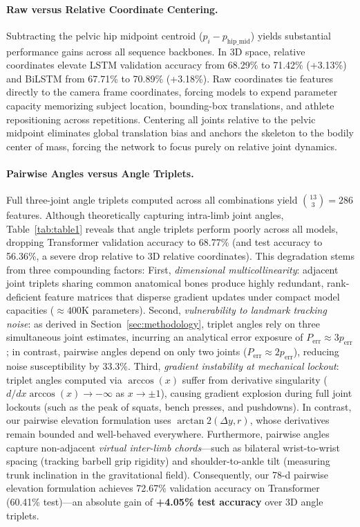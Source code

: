 \documentclass[runningheads]{llncs}
\begin{document}
\paragraph{Raw versus Relative Coordinate Centering.} Subtracting the pelvic hip midpoint centroid ($p_i - p_{\text{hip\_mid}}$) yields substantial performance gains across all sequence backbones. In 3D space, relative coordinates elevate LSTM validation accuracy from 68.29\% to 71.42\% (+3.13\%) and BiLSTM from 67.71\% to 70.89\% (+3.18\%). Raw coordinates tie features directly to the camera frame coordinates, forcing models to expend parameter capacity memorizing subject location, bounding-box translations, and athlete repositioning across repetitions. Centering all joints relative to the pelvic midpoint eliminates global translation bias and anchors the skeleton to the bodily center of mass, forcing the network to focus purely on relative joint dynamics.

\paragraph{Pairwise Angles versus Angle Triplets.} Full three-joint angle triplets computed across all combinations yield $\binom{13}{3} = 286$ features. Although theoretically capturing intra-limb joint angles, Table~\ref{tab:table1} reveals that angle triplets perform poorly across all models, dropping Transformer validation accuracy to 68.77\% (and test accuracy to 56.36\%, a severe drop relative to 3D relative coordinates). This degradation stems from three compounding factors:
First, \textit{dimensional multicollinearity}: adjacent joint triplets sharing common anatomical bones produce highly redundant, rank-deficient feature matrices that disperse gradient updates under compact model capacities ($\approx 400\text{K}$ parameters).
Second, \textit{vulnerability to landmark tracking noise}: as derived in Section~\ref{sec:methodology}, triplet angles rely on three simultaneous joint estimates, incurring an analytical error exposure of $P_{\text{err}} \approx 3p_{\text{err}}$; in contrast, pairwise angles depend on only two joints ($P_{\text{err}} \approx 2p_{\text{err}}$), reducing noise susceptibility by 33.3\%.
Third, \textit{gradient instability at mechanical lockout}: triplet angles computed via $\arccos(x)$ suffer from derivative singularity ($d/dx \arccos(x) \to -\infty$ as $x \to \pm 1$), causing gradient explosion during full joint lockouts (such as the peak of squats, bench presses, and pushdowns). In contrast, our pairwise elevation formulation uses $\arctan2(\Delta y, r)$, whose derivatives remain bounded and well-behaved everywhere.
Furthermore, pairwise angles capture non-adjacent \textit{virtual inter-limb chords}---such as bilateral wrist-to-wrist spacing (tracking barbell grip rigidity) and shoulder-to-ankle tilt (measuring trunk inclination in the gravitational field). Consequently, our 78-d pairwise elevation formulation achieves 72.67\% validation accuracy on Transformer (60.41\% test)---an absolute gain of \textbf{+4.05\% test accuracy} over 3D angle triplets.
\end{document}
